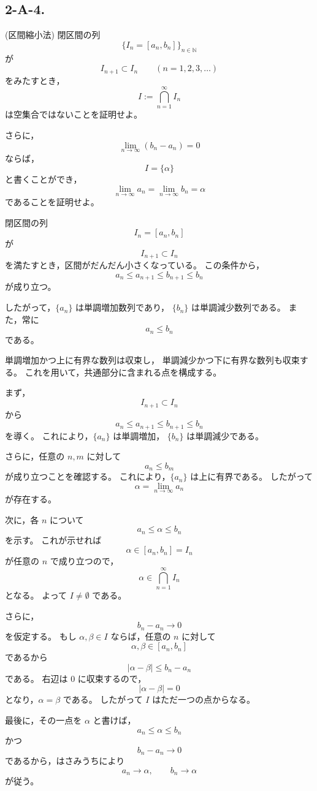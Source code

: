 \subsection{2-A-4.}
\begin{exercise}
	\textup{(区間縮小法)}
	閉区間の列
	\[
	\{I_n=[a_n,b_n]\}_{n\in\mathbb{N}}
	\]
	が
	\[
	I_{n+1}\subset I_n
	\qquad
	(n=1,2,3,\ldots)
	\]
	をみたすとき，
	\[
	I:=\bigcap_{n=1}^{\infty} I_n
	\]
	は空集合ではないことを証明せよ。
	
	さらに，
	\[
	\lim_{n\to\infty}(b_n-a_n)=0
	\]
	ならば，
	\[
	I=\{\alpha\}
	\]
	と書くことができ，
	\[
	\lim_{n\to\infty}a_n
	=
	\lim_{n\to\infty}b_n
	=
	\alpha
	\]
	であることを証明せよ。
\end{exercise}

\begin{background}
	閉区間の列
	\[
	I_n=[a_n,b_n]
	\]
	が
	\[
	I_{n+1}\subset I_n
	\]
	を満たすとき，区間がだんだん小さくなっている。
	この条件から，
	\[
	a_n\leq a_{n+1}\leq b_{n+1}\leq b_n
	\]
	が成り立つ。
	
	したがって，\(\{a_n\}\) は単調増加数列であり，
	\(\{b_n\}\) は単調減少数列である。
	また，常に
	\[
	a_n\leq b_n
	\]
	である。
	
	単調増加かつ上に有界な数列は収束し，
	単調減少かつ下に有界な数列も収束する。
	これを用いて，共通部分に含まれる点を構成する。
\end{background}

\begin{strategy}
	まず，
	\[
	I_{n+1}\subset I_n
	\]
	から
	\[
	a_n\leq a_{n+1}\leq b_{n+1}\leq b_n
	\]
	を導く。
	これにより，\(\{a_n\}\) は単調増加，
	\(\{b_n\}\) は単調減少である。
	
	さらに，任意の \(n,m\) に対して
	\[
	a_n\leq b_m
	\]
	が成り立つことを確認する。
	これにより，\(\{a_n\}\) は上に有界である。
	したがって
	\[
	\alpha=\lim_{n\to\infty}a_n
	\]
	が存在する。
	
	次に，各 \(n\) について
	\[
	a_n\leq \alpha\leq b_n
	\]
	を示す。
	これが示せれば
	\[
	\alpha\in [a_n,b_n]=I_n
	\]
	が任意の \(n\) で成り立つので，
	\[
	\alpha\in\bigcap_{n=1}^{\infty}I_n
	\]
	となる。
	よって \(I\neq\emptyset\) である。
	
	さらに，
	\[
	b_n-a_n\to 0
	\]
	を仮定する。
	もし \(\alpha,\beta\in I\) ならば，任意の \(n\) に対して
	\[
	\alpha,\beta\in [a_n,b_n]
	\]
	であるから
	\[
	|\alpha-\beta|\leq b_n-a_n
	\]
	である。
	右辺は \(0\) に収束するので，
	\[
	|\alpha-\beta|=0
	\]
	となり，\(\alpha=\beta\) である。
	したがって \(I\) はただ一つの点からなる。
	
	最後に，その一点を \(\alpha\) と書けば，
	\[
	a_n\leq \alpha\leq b_n
	\]
	かつ
	\[
	b_n-a_n\to 0
	\]
	であるから，はさみうちにより
	\[
	a_n\to\alpha,
	\qquad
	b_n\to\alpha
	\]
	が従う。
\end{strategy}